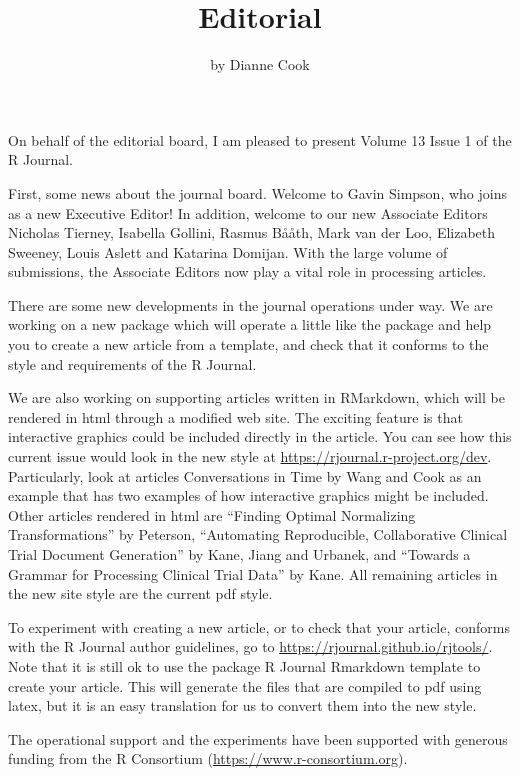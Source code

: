 \title{Editorial}
\author{by Dianne Cook}

\maketitle


On behalf of the editorial board, I am pleased to present Volume 13 Issue 1 of the R Journal.

First, some news about the journal board. Welcome to Gavin Simpson, who joins as a new Executive Editor! In addition, welcome to our new Associate Editors Nicholas Tierney, Isabella Gollini, Rasmus B\r{a}\r{a}th, Mark van der Loo, Elizabeth Sweeney, Louis Aslett and Katarina Domijan. With the large volume of submissions, the Associate Editors now play a vital role in processing articles.

There are some new developments in the journal operations under way. We are working on a new package  which will operate a little like the  package and help you to create a new article from a template, and check that it conforms to the style and requirements of the R Journal.

We are also working on supporting articles written in RMarkdown, which will be rendered in html through a modified  web site. The exciting feature is that interactive graphics could be included directly in the article. You can see how this current issue would look in the new style at \url{https://rjournal.r-project.org/dev}. Particularly, look at articles Conversations in Time by Wang and Cook as an example that has two examples of how interactive graphics might be included. Other articles rendered in html are ``Finding Optimal Normalizing Transformations'' by Peterson, ``Automating Reproducible, Collaborative
Clinical Trial Document Generation'' by Kane, Jiang and Urbanek, and ``Towards a Grammar for Processing Clinical Trial Data'' by Kane. All remaining articles in the new site style are the current pdf style.

To experiment with creating a new article, or to check that your article, conforms with the R Journal author guidelines, go to \url{https://rjournal.github.io/rjtools/}. Note that it is still ok to use the  package R Journal Rmarkdown template to create your article. This will generate the files that are compiled to pdf using latex, but it is an easy translation for us to convert them into the new style.

The operational support and the experiments have been supported with generous funding from the R Consortium (\url{https://www.r-consortium.org}).

